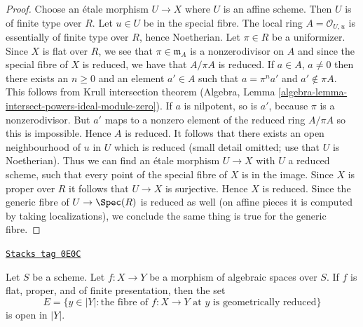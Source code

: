 \begin{proof}
Choose an \'etale morphism $U \to X$ where $U$ is an affine scheme.
Then $U$ is of finite type over $R$. Let $u \in U$ be in the special fibre.
The local ring $A = \mathcal{O}_{U, u}$ is essentially of finite
type over $R$, hence Noetherian. Let $\pi \in R$ be a uniformizer.
Since $X$ is flat over $R$, we see that $\pi \in \mathfrak m_A$
is a nonzerodivisor on $A$ and since the special fibre of $X$
is reduced, we have that $A/\pi A$ is reduced.
If $a \in A$, $a \not = 0$ then there exists an $n \geq 0$ and an element
$a' \in A$ such that $a = \pi^n a'$ and $a' \not \in \pi A$.
This follows from Krull intersection theorem
(Algebra, Lemma \ref{algebra-lemma-intersect-powers-ideal-module-zero}).
If $a$ is nilpotent, so is $a'$, because $\pi$ is a nonzerodivisor.
But $a'$ maps to a nonzero element of the reduced ring $A/\pi A$
so this is impossible. Hence $A$ is reduced. It follows that
there exists an open neighbourhood of $u$ in $U$ which is reduced
(small detail omitted; use that $U$ is Noetherian).
Thus we can find an \'etale morphism $U \to X$ with $U$ a reduced
scheme, such that every point of the special fibre of $X$ is
in the image. Since $X$ is proper over $R$ it follows that
$U \to X$ is surjective. Hence $X$ is reduced. Since the generic fibre of
$U \to \Spec(R)$ is reduced as well (on affine pieces
it is computed by taking localizations), we conclude the same thing
is true for the generic fibre.
\end{proof}

\begin{lemma}
\label{spaces-more-morphisms-lemma-geometrically-reduced-open}
\href{https://stacks.math.columbia.edu/tag/0E0C}{\texttt{Stacks tag 0E0C}}

Let $S$ be a scheme. Let $f : X \to Y$ be a morphism of algebraic
spaces over $S$. If $f$ is flat, proper, and of finite presentation,
then the set
$$
E = \{y \in |Y| : \text{the fibre of }f : X \to Y\text{ at }y
\text{ is geometrically reduced}\}
$$
is open in $|Y|$.
\end{lemma}

